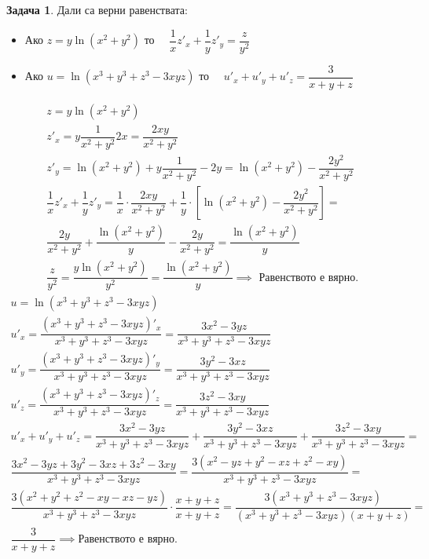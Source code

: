 \documentclass[a4paper,fleqn,12pt]{article}
\theoremstyle{definition}
\newtheorem{task}{Задача}[subsection]
\begin{document}
\begin{task}
Дали са верни равенствата: \\
\begin{itemize}
\item Ако $z = y\ln{(x^2+y^2)}$ то $\quad \dfrac{1}{x} z'_x + \dfrac{1}{y} z'_y = \dfrac{z}{y^2}$
\item Ако $u = \ln{(x^3+y^3 + z^3 - 3xyz)} $ то $ \quad u'_x + u'_y + u'_z = \dfrac{3}{x+y+z}$
\end{itemize}
\begin{gather*}
z = y\ln{(x^2+y^2)} \\
z'_x = y\dfrac{1}{x^2 + y^2} 2x = \dfrac{2xy}{x^2 + y^2}\\
z'_y = \ln{(x^2+y^2)} + y\dfrac{1}{x^2 + y^2} -2y = \ln{(x^2+y^2)} - \dfrac{2y^2}{x^2 + y^2}\\ 
\dfrac{1}{x} z'_x + \dfrac{1}{y} z'_y = \dfrac{1}{x} \cdot \dfrac{2xy}{x^2 + y^2}  + \dfrac{1}{y} \cdot \left[\ln{(x^2+y^2)} - \dfrac{2y^2}{x^2 + y^2}\right] =\\
\dfrac{2y}{x^2 + y^2} + \dfrac{\ln{(x^2+y^2)}}{y} - \dfrac{2y}{x^2 + y^2} =   \dfrac{\ln{(x^2+y^2)}}{y} \\
\dfrac{z}{y^2} = \dfrac{y\ln{(x^2+y^2)}}{y^2} = \dfrac{\ln{(x^2+y^2)}}{y} \implies \text{ Равенството е вярно. }
\end{gather*}
\begin{gather*}
u = \ln{(x^3+y^3 + z^3 - 3xyz)} \\
u'_x = \dfrac{(x^3+y^3 + z^3 - 3xyz)'_x}{x^3+y^3 + z^3 - 3xyz} =  \dfrac{3x^2 - 3yz}{x^3+y^3 + z^3 - 3xyz}\\
u'_y = \dfrac{(x^3+y^3 + z^3 - 3xyz)'_y}{x^3+y^3 + z^3 - 3xyz} =  \dfrac{3y^2 - 3xz}{x^3+y^3 + z^3 - 3xyz}\\
u'_z = \dfrac{(x^3+y^3 + z^3 - 3xyz)'_z}{x^3+y^3 + z^3 - 3xyz} =  \dfrac{3z^2 - 3xy}{x^3+y^3 + z^3 - 3xyz}\\
u'_x + u'_y + u'_z  = \dfrac{3x^2 - 3yz}{x^3+y^3 + z^3 - 3xyz} + \dfrac{3y^2 - 3xz}{x^3+y^3 + z^3 - 3xyz} + \dfrac{3z^2 - 3xy}{x^3+y^3 + z^3 - 3xyz} =\\
\dfrac{3x^2 - 3yz + 3y^2 - 3xz + 3z^2 - 3xy}{x^3+y^3 + z^3 - 3xyz} = \dfrac{3(x^2 - yz + y^2 - xz + z^2 - xy)}{x^3+y^3 + z^3 - 3xyz} =\\
\dfrac{3(x^2 + y^2 + z^2 -xy -xz -yz)}{x^3+y^3 + z^3 - 3xyz} \cdot \dfrac{x+y+z}{x+y+z} = \dfrac{3(x^3+y^3 + z^3 - 3xyz)}{(x^3+y^3 + z^3 - 3xyz)(x+y+z)} =\\
\dfrac{3}{x+y+z} \implies \text{Равенството е вярно.}
\end{gather*}
\end{task}
\end{document}
